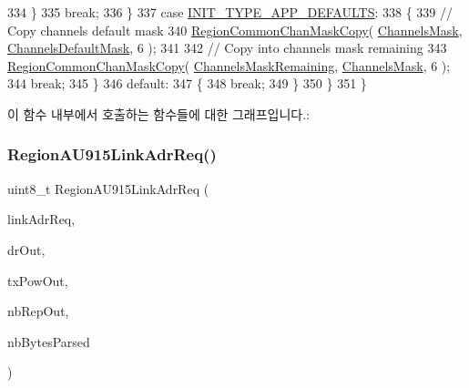 \begin{DoxyCode}
334             \}
335             \textcolor{keywordflow}{break};
336         \}
337         \textcolor{keywordflow}{case} \mbox{\hyperlink{group___r_e_g_i_o_n_gga11ecad794560a3d3961bdf1c9a27d3b2a3d260b94611dd833c5243c16ca26c3f0}{INIT\_TYPE\_APP\_DEFAULTS}}:
338         \{
339             \textcolor{comment}{// Copy channels default mask}
340             \mbox{\hyperlink{group___r_e_g_i_o_n_c_o_m_m_o_n_ga95f5199d490113269fae7f2e0569e9a0}{RegionCommonChanMaskCopy}}( \mbox{\hyperlink{_region_a_u915_8c_a2188957b5ca6af8092154d7ccbfa5757}{ChannelsMask}}, 
      \mbox{\hyperlink{_region_a_u915_8c_ac127b19779301713d5ed92eb03366a2d}{ChannelsDefaultMask}}, 6 );
341 
342             \textcolor{comment}{// Copy into channels mask remaining}
343             \mbox{\hyperlink{group___r_e_g_i_o_n_c_o_m_m_o_n_ga95f5199d490113269fae7f2e0569e9a0}{RegionCommonChanMaskCopy}}( 
      \mbox{\hyperlink{_region_a_u915_8c_a567333cec639a004655cc1717e9d0928}{ChannelsMaskRemaining}}, \mbox{\hyperlink{_region_a_u915_8c_a2188957b5ca6af8092154d7ccbfa5757}{ChannelsMask}}, 6 );
344             \textcolor{keywordflow}{break};
345         \}
346         \textcolor{keywordflow}{default}:
347         \{
348             \textcolor{keywordflow}{break};
349         \}
350     \}
351 \}
\end{DoxyCode}
이 함수 내부에서 호출하는 함수들에 대한 그래프입니다.\+:
\mbox{\label{group___r_e_g_i_o_n_a_u915_ga2614037d99a37bdd1d3d7df1a3361201}} 
\subsubsection{\texorpdfstring{Region\+A\+U915\+Link\+Adr\+Req()}{RegionAU915LinkAdrReq()}}
{\footnotesize\ttfamily uint8\+\_\+t Region\+A\+U915\+Link\+Adr\+Req (\begin{DoxyParamCaption}\item[{\mbox{\hyperlink{group___r_e_g_i_o_n_gad4af503e8d4de1846129e26a799a1e8e}{Link\+Adr\+Req\+Params\+\_\+t}} $\ast$}]{link\+Adr\+Req,  }\item[{int8\+\_\+t $\ast$}]{dr\+Out,  }\item[{int8\+\_\+t $\ast$}]{tx\+Pow\+Out,  }\item[{uint8\+\_\+t $\ast$}]{nb\+Rep\+Out,  }\item[{uint8\+\_\+t $\ast$}]{nb\+Bytes\+Parsed }\end{DoxyParamCaption})}



